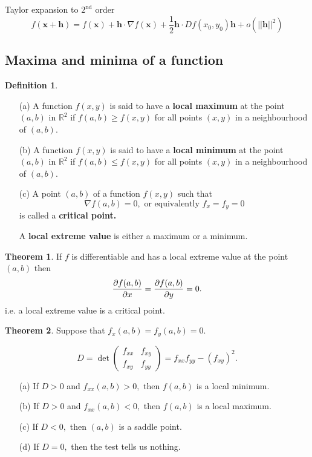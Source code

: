 \documentclass[12pt, a4paper]{article}
\newcommand{\bb}[1]{\mathbb{#1}}
\theoremstyle{definition}
\newtheorem{definition}{Definition}[section]
\newtheorem{theorem}{Theorem}[section]
\theoremstyle{plain}
\begin{document}
\begin{tcolorbox}
Taylor expansion to $2^{\text{nd}}$ order $$f(\mathbf{x+h})=f(\mathbf{x})+\mathbf{h}\cdot \nabla f(\mathbf{x})+\frac{1}{2}\mathbf{h}\cdot Df(x_0,y_0)\mathbf{h}+o(||\mathbf{h}||^2)$$
\end{tcolorbox}

\subsection{Maxima and minima of a function}

\begin{definition}
\hphantom{This text is to make space so it looks good when finalised.} 
\begin{enumerate}
	
	\item[(a)] A function $f(x,y)$ is said to have a \textbf{local maximum} at the point $(a,b)$ in $\bb{R}^2$ if $f(a,b) \geq f(x,y)$ for all points $(x,y)$ in a neighbourhood of $(a,b).$

	\item[(b)] A function $f(x,y)$ is said to have a \textbf{local minimum} at the point $(a,b)$ in $\bb{R}^2$ if $f(a,b) \leq f(x,y)$ for all points $(x,y)$ in a neighbourhood of $(a,b).$

	\item[(c)] A point $(a,b)$ of a function $f(x,y)$ such that $$\nabla f(a,b)=0, \text{ or equivalently } f_x =f_y=0$$ is called a \textbf{critical point.}

	A \textbf{local extreme value} is either a maximum or a minimum.

\end{enumerate}
\end{definition}

\begin{theorem}
If $f$ is differentiable and has a local extreme value at the point $(a,b)$ then $$\pdv{f(a,b)}{x}=\pdv{f(a,b)}{y}=0.$$ i.e. a local extreme value is a critical point. 
\end{theorem}

\begin{theorem}
Suppose that $f_x(a,b)=f_y(a,b)=0.$

$$D=\det\begin{pmatrix} f_{xx} & f_{xy} \\ f_{xy} & f_{yy} \end{pmatrix} = f_{xx}f_{yy}-(f_{xy})^2.$$

\begin{enumerate}
	
	\item[(a)] If $D > 0$ and $f_{xx}(a,b)>0,$ then $f(a,b)$ is a local minimum.

	\item[(b)] If $D>0$ and $f_{xx}(a,b)<0,$ then $f(a,b)$ is a local maximum.

	\item[(c)] If $D<0,$ then $(a,b)$ is a saddle point.

	\item[(d)] If $D=0,$ then the test tells us nothing.

\end{enumerate}
\end{theorem}
\end{document}
